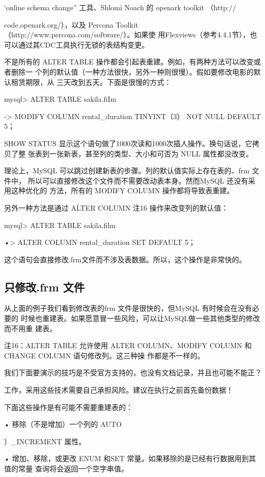 ‘online schema change” 工具、Shlomi Noach 的 openark toolkit （http://

code.openark.org/），以及 Percona Toolkit （http://www.percona.com/software/）。如果使
用Flexviews（参考4.4.1节），也可以通过其CDC工具执行无锁的表结构变更。

不是所有的 ALTER TABLE 操作都会引起表重建。例如，有两种方法可以改变或者删除一
个列的默认值（一种方法很快，另外一种则很慢）。假如要修改电影的默认租赁期限，从
三天改到五天。下面是很慢的方式：

mysql> ALTER TABLE sakila.fiIm

-> MODIFY COLUMN rental\_duration TINYINT（3） NOT NULL DEFAULT 5；

SHOW STATUS 显示这个语句做了1000次读和1000次插人操作。换句话说，它拷贝了整
张表到一张新表，甚至列的类型、大小和可否为 NULL 属性都没改变。

理论上，MySQL 可以跳过创建新表的步骤。列的默认值实际上存在表的、frm 文件中，
所以可以直接修改这个文件而不需要改动表本身。然而MySQL 还没有采用这种优化的
方法，所有的 MODIFY COLUMN 操作都将导致表重建。

另外一种方法是通过 ALTER COLUMN 注16 操作来改变列的默认值：

mysql> ALTER TABLE sakila.film

•> ALTER COLUMN rental\_duration SET DEFAULT 5；

这个语句会直接修改.frm文件而不涉及表数据。所以，这个操作是非常快的。

\subsection{只修改.frm 文件}
从上面的例子我们看到修改表的frm 文件是很快的，但MySQL 有时候会在没有必要的
时候也重建表。如果愿意冒一些风险，可以让MySQL做一些其他类型的修改而不用重
建表。

注16：ALTER TABLE 允许使用 ALTER COLUMN、MODIFY COLUMN 和CHANGE COLUMN 语句修改列。这三种操
作都是不一样的。

我们下面要演示的技巧是不受官方支持的，也没有文档记录，并且也可能不能正？

工作，采用这些技术需要自己承担风险。建议在执行之前首先备份数据！

下面这些操作是有可能不需要重建表的：

• 移除（不是增加）一个列的 AUTO

）\_INCREMENT 属性。

• 增加、移除，或更改 ENUM 和SET 常量。如果移除的是已经有行数据用到其值的常量
查询将会返回一个空字串值。

